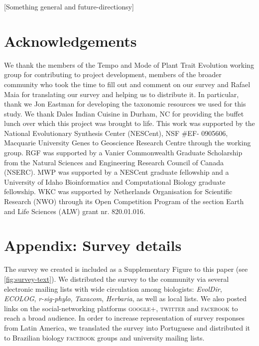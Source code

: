 \documentclass[a4paper,12pt]{article}
\begin{document}
[Something general and future-directionsy]

\section{Acknowledgements}

We thank the members of the Tempo and Mode of Plant Trait
Evolution working group for contributing to project development,
members of the broader community who took the time to fill out and
comment on our survey and Rafael Maia for translating our survey and
helping us to distribute it.  In particular, thank we Jon Eastman for 
developing the taxonomic resources we used for this study.
%
We thank Dales Indian Cuisine in Durham, NC for providing the buffet
lunch over which this project was brought to life.
%
This work was supported by the National Evolutionary Synthesis Center
(NESCent), NSF \#EF- 0905606, Macquarie University Genes to Geoscience
Research Centre through the working group.
%
RGF was supported by a Vanier Commonwealth Graduate Scholarship from
the Natural Sciences and Engineering Research Council of Canada
(NSERC).
MWP was supported by a NESCent graduate fellowship and a 
University of Idaho Bioinformatics and Computational Biology graduate fellowship.
%
WKC was supported by Netherlands Organisation for
Scientific Research (NWO) through its Open Competition Program of the
section Earth and Life Sciences (ALW) grant nr. 820.01.016.



\section{Appendix: Survey details}
%
The survey we created is included as a Supplementary Figure to
this paper (see \ref{fig:survey-text}). We distributed the survey to the 
community via several electronic
mailing lists with wide circulation among biologists: \emph{EvolDir},
\emph{ECOLOG}, \emph{\mbox{r-sig-phylo}}, \emph{Taxacom},
\emph{Herbaria}, as well as local lists. We also posted links on the
social-networking platforms \textsc{google+}, \textsc{twitter} and
\textsc{facebook} to reach a broad audience.
%
In order to increase representation of survey responses from Latin
America, we translated the survey into Portuguese and distributed it
to Brazilian biology \textsc{facebook} groups and university mailing
lists.
\end{document}
